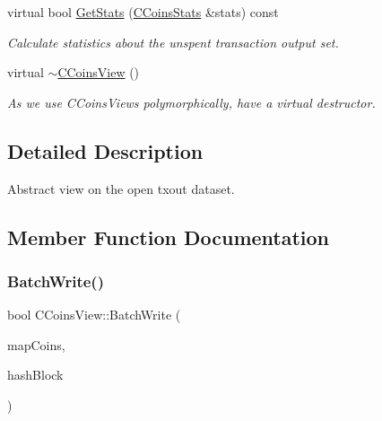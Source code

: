 \begin{DoxyCompactItemize}
\item 
\mbox{\label{class_c_coins_view_adbd7f73ba071c6e441dd88d95b8f2c0d}} 
virtual bool \mbox{\hyperlink{class_c_coins_view_adbd7f73ba071c6e441dd88d95b8f2c0d}{Get\+Stats}} (\mbox{\hyperlink{struct_c_coins_stats}{C\+Coins\+Stats}} \&stats) const
\begin{DoxyCompactList}\small\item\em Calculate statistics about the unspent transaction output set. \end{DoxyCompactList}\item 
\mbox{\label{class_c_coins_view_a7ffb4218bf991ddff47339e44c8710da}} 
virtual \mbox{\hyperlink{class_c_coins_view_a7ffb4218bf991ddff47339e44c8710da}{$\sim$\+C\+Coins\+View}} ()
\begin{DoxyCompactList}\small\item\em As we use C\+Coins\+Views polymorphically, have a virtual destructor. \end{DoxyCompactList}\end{DoxyCompactItemize}


\subsection{Detailed Description}
Abstract view on the open txout dataset. 

\subsection{Member Function Documentation}
\mbox{\label{class_c_coins_view_ad7dc37396ca4fac7014cea06fec7178e}} 
\subsubsection{\texorpdfstring{BatchWrite()}{BatchWrite()}}
{\footnotesize\ttfamily bool C\+Coins\+View\+::\+Batch\+Write (\begin{DoxyParamCaption}\item[{C\+Coins\+Map \&}]{map\+Coins,  }\item[{const \mbox{\hyperlink{classuint256}{uint256}} \&}]{hash\+Block }\end{DoxyParamCaption})\hspace{0.3cm}{\ttfamily [virtual]}}

